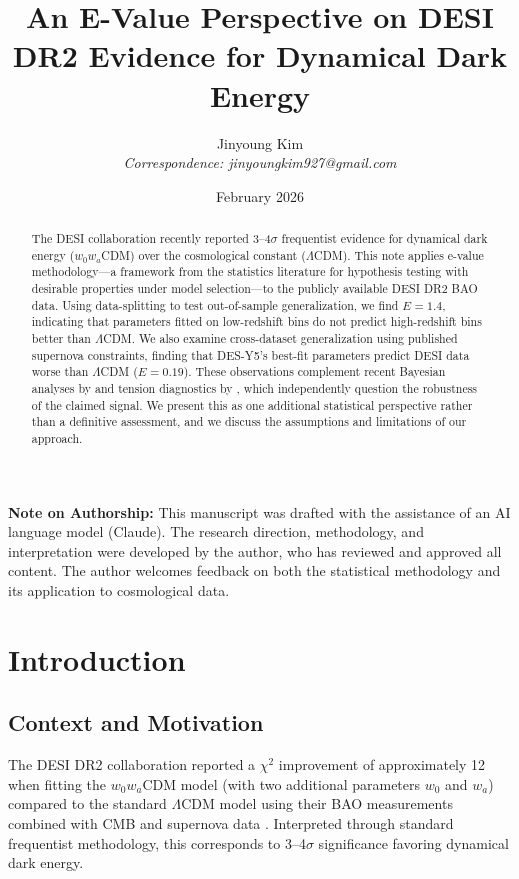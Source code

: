 \documentclass[11pt,a4paper]{article}
\title{An E-Value Perspective on DESI DR2 Evidence for Dynamical Dark Energy}
\author{
Jinyoung Kim\\
\small \textit{Correspondence: jinyoungkim927@gmail.com}
}
\date{February 2026}
\newcommand{\LCDM}{$\Lambda$CDM}
\begin{document}
\maketitle

\begin{abstract}
The DESI collaboration recently reported 3--4$\sigma$ frequentist evidence for dynamical dark energy ($w_0w_a$CDM) over the cosmological constant (\LCDM). This note applies e-value methodology---a framework from the statistics literature for hypothesis testing with desirable properties under model selection---to the publicly available DESI DR2 BAO data. Using data-splitting to test out-of-sample generalization, we find $E = 1.4$, indicating that parameters fitted on low-redshift bins do not predict high-redshift bins better than \LCDM. We also examine cross-dataset generalization using published supernova constraints, finding that DES-Y5's best-fit parameters predict DESI data worse than \LCDM{} ($E = 0.19$). These observations complement recent Bayesian analyses by \citet{OngBayesian2025} and tension diagnostics by \citet{WangMota2025}, which independently question the robustness of the claimed signal. We present this as one additional statistical perspective rather than a definitive assessment, and we discuss the assumptions and limitations of our approach.
\end{abstract}

\vspace{1em}
\noindent\textbf{Note on Authorship:} This manuscript was drafted with the assistance of an AI language model (Claude). The research direction, methodology, and interpretation were developed by the author, who has reviewed and approved all content. The author welcomes feedback on both the statistical methodology and its application to cosmological data.

\tableofcontents
\newpage

\section{Introduction}
\label{sec:intro}

\subsection{Context and Motivation}

The DESI DR2 collaboration reported a $\chi^2$ improvement of approximately 12 when fitting the $w_0w_a$CDM model (with two additional parameters $w_0$ and $w_a$) compared to the standard \LCDM{} model using their BAO measurements combined with CMB and supernova data \citep{DESI2025}. Interpreted through standard frequentist methodology, this corresponds to 3--4$\sigma$ significance favoring dynamical dark energy.
\end{document}
